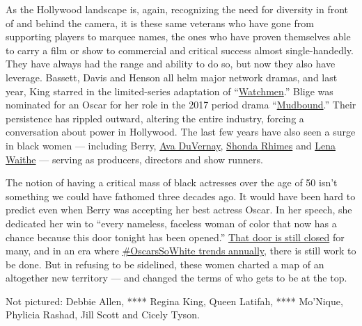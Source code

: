 As the Hollywood landscape is, again, recognizing the need for diversity
in front of and behind the camera, it is these same veterans who have
gone from supporting players to marquee names, the ones who have proven
themselves able to carry a film or show to commercial and critical
success almost single-handedly. They have always had the range and
ability to do so, but now they also have leverage. Bassett, Davis and
Henson all helm major network dramas, and last year, King starred in the
limited-series adaptation of
``\href{https://www.nytimes.com/2019/10/16/arts/television/watchmen-comic-history.html}{Watchmen}.''
Blige was nominated for an Oscar for her role in the 2017 period drama
``\href{https://www.nytimes.com/watching/titles/mudbound}{Mudbound}.''
Their persistence has rippled outward, altering the entire industry,
forcing a conversation about power in Hollywood. The last few years have
also seen a surge in black women --- including Berry,
\href{https://www.nytimes.com/2019/06/20/movies/ava-duvernay-movies.html}{Ava
DuVernay},
\href{https://www.nytimes.com/2018/07/20/business/media/shonda-rhimes-netflix-series.html}{Shonda
Rhimes} and
\href{https://www.nytimes.com/2019/12/02/movies/lena-waithe-queen-and-slim.html}{Lena
Waithe} --- serving as producers, directors and show runners.

The notion of having a critical mass of black actresses over the age of
50 isn't something we could have fathomed three decades ago. It would
have been hard to predict even when Berry was accepting her best actress
Oscar. In her speech, she dedicated her win to ``every nameless,
faceless woman of color that now has a chance because this door tonight
has been opened.''
\href{https://www.nytimes.com/2020/02/07/movies/essence-lunch-alfre-woodard.html}{That
door is still closed} for many, and in an era where
\href{https://www.nytimes.com/2020/02/06/movies/oscarssowhite-history.html}{\#OscarsSoWhite
trends annually}, there is still work to be done. But in refusing to be
sidelined, these women charted a map of an altogether new territory ---
and changed the terms of who gets to be at the top.

Not pictured: Debbie Allen, **** Regina King, Queen Latifah, ****
Mo'Nique, Phylicia Rashad, Jill Scott and Cicely Tyson.

